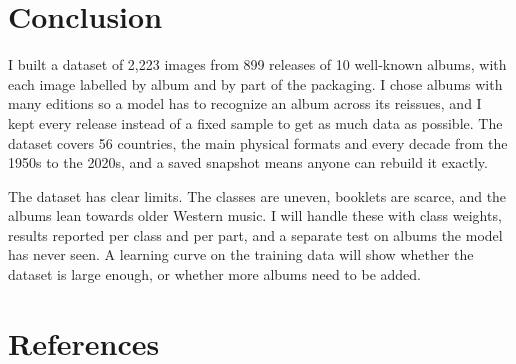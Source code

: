 \documentclass[10pt,a4paper,twocolumn]{article}
\begin{document}
\section{Conclusion}
I built a dataset of 2,223 images from 899 releases of 10 well-known albums, with each image labelled by album and by part of the packaging. I chose albums with many editions so a model has to recognize an album across its reissues, and I kept every release instead of a fixed sample to get as much data as possible. The dataset covers 56 countries, the main physical formats and every decade from the 1950s to the 2020s, and a saved snapshot means anyone can rebuild it exactly.

The dataset has clear limits. The classes are uneven, booklets are scarce, and the albums lean towards older Western music. I will handle these with class weights, results reported per class and per part, and a separate test on albums the model has never seen. A learning curve on the training data will show whether the dataset is large enough, or whether more albums need to be added.

\section*{References}
\end{document}
